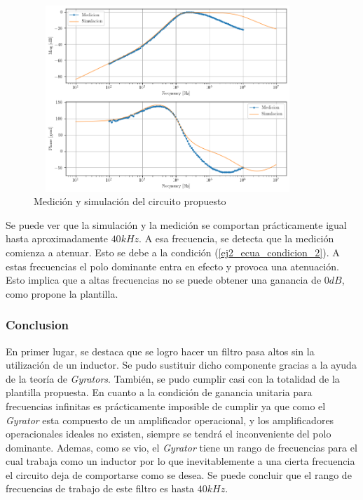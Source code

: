 \documentclass[12pt,a4paper]{article}
\begin{document}
\begin{figure}[h!]                                                       
    \centering\includegraphics[width=0.9\textwidth, height=7cm]{Resources/ej2_hp_med_and_sim.png}
    \caption{Medición y simulación del circuito propuesto }
    \label{fig:ej2_hp_med_and_sim}
    \end{figure}

Se puede ver que la simulación y la medición se comportan prácticamente igual hasta aproximadamente $40kHz$. A esa frecuencia, se detecta que la medición comienza a atenuar. Esto se debe a la condición (\ref{ej2_ecua_condicion_2}). A estas frecuencias el polo dominante entra en efecto y provoca una atenuación. Esto implica que a altas frecuencias no se puede obtener una ganancia de $0dB$, como propone la plantilla. 



\subsubsection{Conclusion}

En primer lugar, se destaca que se logro hacer un filtro pasa altos sin la utilización de un inductor. Se pudo sustituir dicho componente gracias a la ayuda de la teoría de \textit{Gyrators}. También, se pudo cumplir casi con la totalidad de la plantilla propuesta. En cuanto a la condición de ganancia unitaria para frecuencias infinitas es prácticamente imposible de cumplir ya que como el \textit{Gyrator} esta compuesto de un amplificador operacional, y los amplificadores operacionales ideales no existen, siempre se tendrá el inconveniente del polo dominante. Ademas, como se vio, el \textit{Gyrator} tiene un rango de frecuencias para el cual trabaja como un inductor por lo que inevitablemente a una cierta frecuencia el circuito deja de comportarse como se desea. Se puede concluir que el rango de frecuencias de trabajo de este filtro es hasta $40kHz$. 
\end{document}
